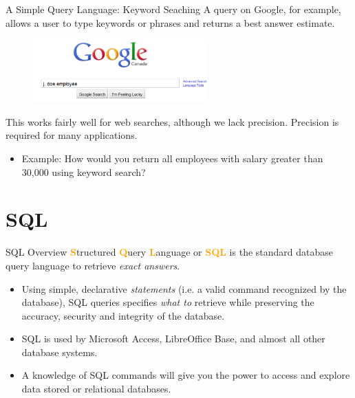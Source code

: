 \documentclass[xcolor=svgnames]{beamer}
\newcommand{\define}[1]{\textbf{\textcolor{orange}{#1}}}
\theoremstyle{example}
\begin{document}
\begin{frame}{A Simple Query Language: Keyword Seaching}
A query on Google, for example, 
allows a user to type keywords or phrases and returns a best answer estimate.
\begin{figure}[htbp]
\begin{center}
\includegraphics[width=0.6\textwidth]{img/google}
\end{center}
\end{figure}



This works fairly well for web searches, although we lack precision.  Precision is required for many applications.\\
\begin{itemize}
\item Example: How would you return all employees with salary greater than 30,000 using keyword search?
\end{itemize}
\end{frame}

\section{SQL}
\begin{frame}{SQL Overview}
\define Structured \define Query \define  Language or \define{SQL} is the standard database query language to retrieve \emph{exact answers}.\medskip
\begin{itemize}
\item Using simple, declarative \emph{statements} (i.e. a valid command recognized by the database), SQL queries specifies \textit{what to} retrieve %
while preserving the accuracy, security and integrity of the database.\medskip
\item SQL is used by Microsoft Access, LibreOffice Base, and almost all other database systems.\medskip
\item A knowledge of SQL commands will give you the power to access and explore data stored or relational databases.
\end{itemize}
\end{frame}
\end{document}
